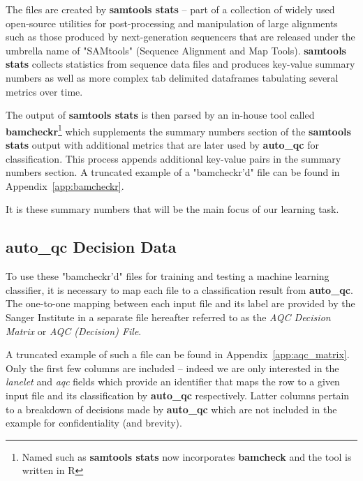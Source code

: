 
The files are created by \textbf{samtools stats} -- part of a collection of
widely used open-source utilities for post-processing and manipulation of large
alignments such as those produced by next-generation sequencers that are
released under the umbrella name of "SAMtools"\citep{samtools} (Sequence
Alignment and Map Tools). \textbf{samtools stats} collects statistics from
sequence data files and produces key-value summary numbers as well as more
complex tab delimited dataframes tabulating several metrics over time.

The output of \textbf{samtools stats} is then parsed by an in-house tool called
\textbf{bamcheckr}\footnote{Named such as \textbf{samtools stats} now incorporates
\textbf{bamcheck} and the tool is written in R} which supplements the summary
numbers section of the \textbf{samtools stats} output with additional metrics
that are later used by \textbf{auto\_qc} for classification.  This process
appends additional key-value pairs in the summary numbers section.  A truncated
example of a "bamcheckr'd" file can be found in Appendix~\ref{app:bamcheckr}.

It is these summary numbers that will be the main focus of our learning task.


\subsection{auto\_qc Decision Data}

To use these "bamcheckr'd" files for training and testing a machine learning
classifier, it is necessary to map each file to a classification result from
\textbf{auto\_qc}. The one-to-one mapping between each input file and its label
are provided by the Sanger Institute in a separate file hereafter referred to as
the \textit{AQC Decision Matrix} or \textit{AQC (Decision) File}.

A truncated example of such a file can be found in
Appendix~\ref{app:aqc_matrix}.  Only the first few columns are included --
indeed we are only interested in the \textit{lanelet} and \textit{aqc} fields
which provide an identifier that maps the row to a given input file and its
classification by \textbf{auto\_qc} respectively.  Latter columns pertain to a
breakdown of decisions made by \textbf{auto\_qc} which are not included in the
example for confidentiality (and brevity).


